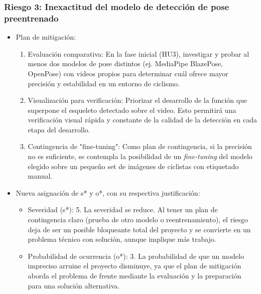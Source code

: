 \documentclass[
11pt, %
]{charter}
\begin{document}
\subsubsection*{Riesgo 3: Inexactitud del modelo de detección de pose preentrenado}
\begin{itemize}
    \item Plan de mitigación:
    \begin{enumerate}
        \item Evaluación comparativa: En la fase inicial (HU3), investigar y probar al menos dos modelos de pose distintos (ej. MediaPipe BlazePose, OpenPose) con videos propios para determinar cuál ofrece mayor precisión y estabilidad en un entorno de ciclismo.
        \item Visualización para verificación: Priorizar el desarrollo de la función que superpone el esqueleto detectado sobre el video. Esto permitirá una verificación visual rápida y constante de la calidad de la detección en cada etapa del desarrollo.
        \item Contingencia de "fine-tuning": Como plan de contingencia, si la precisión no es suficiente, se contempla la posibilidad de un \textit{fine-tuning} del modelo elegido sobre un pequeño set de imágenes de ciclistas con etiquetado manual.
    \end{enumerate}
    \item Nueva asignación de s* y o*, con su respectiva justificación:
    \begin{itemize}
        \item Severidad (s*): 5. La severidad se reduce. Al tener un plan de contingencia claro (prueba de otro modelo o reentrenamiento), el riesgo deja de ser un posible bloqueante total del proyecto y se convierte en un problema técnico con solución, aunque implique más trabajo.
        \item Probabilidad de ocurrencia (o*): 3. La probabilidad de que un modelo impreciso arruine el proyecto disminuye, ya que el plan de mitigación aborda el problema de frente mediante la evaluación y la preparación para una solución alternativa.
    \end{itemize}
\end{itemize}
\end{document}

